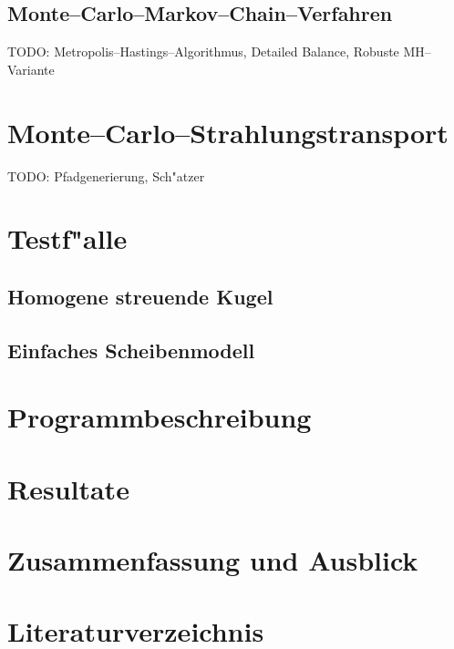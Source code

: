 \documentclass[11pt,a4paper]{scrartcl}
\begin{document}
	\subsection{Monte--Carlo--Markov--Chain--Verfahren}
	TODO: Metropolis--Hastings--Algorithmus, Detailed Balance, Robuste MH--Variante

	\section{Monte--Carlo--Strahlungstransport}
	TODO: Pfadgenerierung, Sch"atzer
	
	\section{Testf"alle}
	\subsection{Homogene streuende Kugel}
	\subsection{Einfaches Scheibenmodell}
	
	\section{Programmbeschreibung}
	\section{Resultate}
	\section{Zusammenfassung und Ausblick}
	\section{Literaturverzeichnis}
\end{document}
